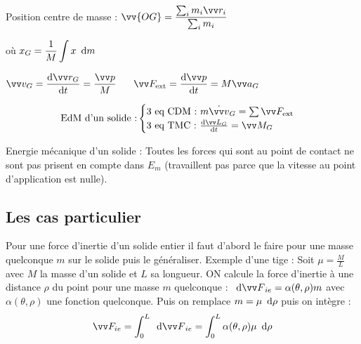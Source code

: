\documentclass[../main.tex]{subfiles}
\begin{document}
Position centre de masse : \(\displaystyle \vv{OG}=\frac{\sum_im_i\pos_i}{\sum_im_i}\)

où \(\displaystyle x_G = \frac{1}{M}\int x\,\,\,\mathrm{d}{m}\) 


\(\displaystyle \vi_G = \dv{\pos_G}{t}=\frac{\qm}{M}\phantom{text}\F_{\exte}=\dv{\qm}{t}=M\ac_G\)

\[\text{EdM d'un solide :}
  \begin{cases}
    \text{3 eq CDM : }m\dot{\vi}_G=\sum\F_{\exte}\\
    \text{3 eq TMC : }\dv{\mc_G}{t}=\mf_G
  \end{cases}
\]

Energie mécanique d'un solide : Toutes les forces qui sont au point de contact ne sont pas prisent en compte dans \(E_m\) (travaillent pas parce que la vitesse au point d'application est nulle).

\subsection{Les cas particulier}
Pour une force d'inertie d'un solide entier il faut d'abord le faire pour une masse quelconque \(m\) sur le solide puis le généraliser. Exemple d'une tige : Soit \(\displaystyle\mu=\frac{M}{L}\) avec \(M\) la masse d'un solide et \(L\) sa longueur. ON calcule la force d'inertie à une distance \(\rho\) du point pour une masse \(m\) quelconque : \(\dee \F_{ie}=\alpha(\theta,\rho)m\) avec \(\alpha(\theta, \rho)\) une fonction quelconque. Puis on remplace \(m=\mu\,\,\,\mathrm{d}{\rho}\) puis on intègre : 
\[
  \F_{ie} = \int_0^L \dee\F_{ie} = \int_0^L\alpha(\theta,\rho)\mu\dee\rho
\]
\end{document}
